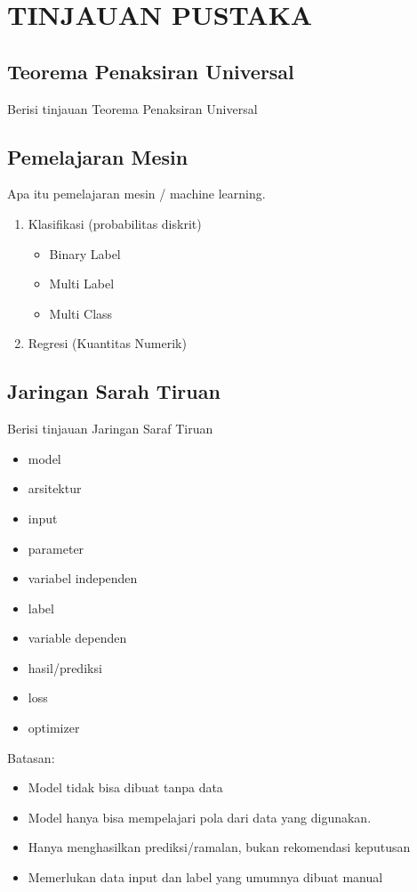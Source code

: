 

\chapter{TINJAUAN PUSTAKA}
\label{cha:2-TinjauanPustaka}

\section{Teorema Penaksiran Universal \label{sec:2-TeoremaPenaksiranUniversal}}
Berisi tinjauan Teorema Penaksiran Universal~\cite{fastbook} \cite{8765346}

\section{Pemelajaran Mesin\label{sec:2-PemelajaranMesin}}
Apa itu pemelajaran mesin / machine learning.
\begin{enumerate}
  \item Klasifikasi (probabilitas diskrit)
  \begin{itemize}
    \item Binary Label
    \item Multi Label
    \item Multi Class
  \end{itemize}
  \item Regresi (Kuantitas Numerik)
\end{enumerate}

\section{Jaringan Sarah Tiruan \label{sec:2-JaringanSarafTiruan}}
Berisi tinjauan Jaringan Saraf Tiruan

\begin{itemize}
  \item model
  \item arsitektur
  \item input
  \item parameter
  \item variabel independen
  \item label
  \item variable dependen
  \item hasil/prediksi
  \item loss
  \item optimizer
\end{itemize}

Batasan:
\begin{itemize}
  \item Model tidak bisa dibuat tanpa data
  \item Model hanya bisa mempelajari pola dari data yang digunakan.
  \item Hanya menghasilkan prediksi/ramalan, bukan rekomendasi keputusan
  \item Memerlukan data input dan label yang umumnya dibuat manual
\end{itemize}


